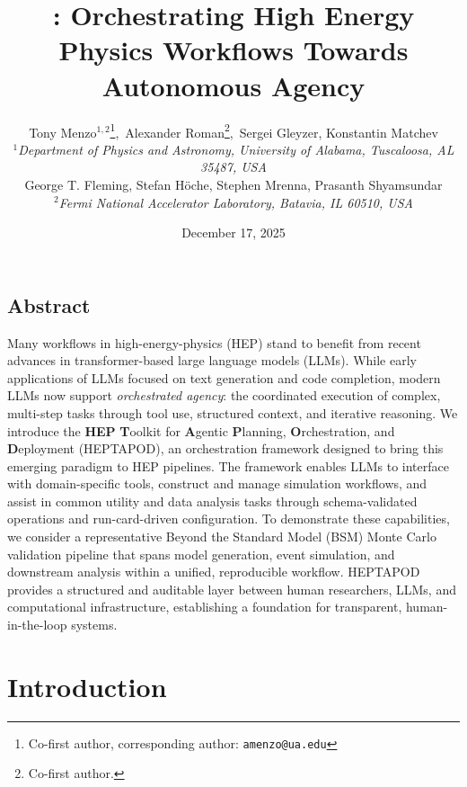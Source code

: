 \documentclass[11pt,oneside]{article}
\title{\textbf{\pkgname: Orchestrating High Energy Physics Workflows Towards Autonomous Agency}}
\author{Tony Menzo$^{1,2}$\footnote{Co-first author, corresponding author: \texttt{amenzo@ua.edu}},\, Alexander Roman\footnote{Co-first author.},\,  Sergei Gleyzer, Konstantin Matchev \\
{$^1$}\textit{Department of Physics and Astronomy, University of Alabama, Tuscaloosa, AL 35487, USA}\\[12pt]
George T. Fleming, Stefan H\"{o}che, Stephen Mrenna, Prasanth Shyamsundar\\
{$^2$}\textit{Fermi National Accelerator Laboratory, Batavia, IL 60510, USA}
}
\date{December 17, 2025}
\numberwithin{equation}{section}
\newcommand{\pkgname}{HEPTAPOD\xspace}
\begin{document}
\maketitle

\begin{center}
\begin{minipage}{13cm}

\section*{Abstract} 
Many workflows in high-energy-physics (HEP) stand to benefit from recent advances in transformer-based large language models (LLMs). 
While early applications of LLMs focused on text generation and code completion, modern LLMs now support \emph{orchestrated agency}: the coordinated execution of complex, multi-step tasks through tool use, structured context, and iterative reasoning. 
We introduce the \textbf{HEP} \textbf{T}oolkit for \textbf{A}gentic \textbf{P}lanning, \textbf{O}rchestration, and \textbf{D}eployment (\pkgname), an orchestration framework designed to bring this emerging paradigm to HEP pipelines. 
The framework enables LLMs to interface with domain-specific tools, construct and manage simulation workflows, and assist in common utility and data analysis tasks through schema-validated operations and run-card-driven configuration.
To demonstrate these capabilities, we consider a representative Beyond the Standard Model (BSM) Monte Carlo validation pipeline that spans model generation, event simulation, and downstream analysis within a unified, reproducible workflow. 
\pkgname provides a structured and auditable layer between human researchers, LLMs, and computational infrastructure, establishing a foundation for transparent, human-in-the-loop systems. 

\end{minipage}
\end{center}
\vspace*{1cm}

\newpage
\tableofcontents
\newpage
\section{Introduction}
\end{document}
